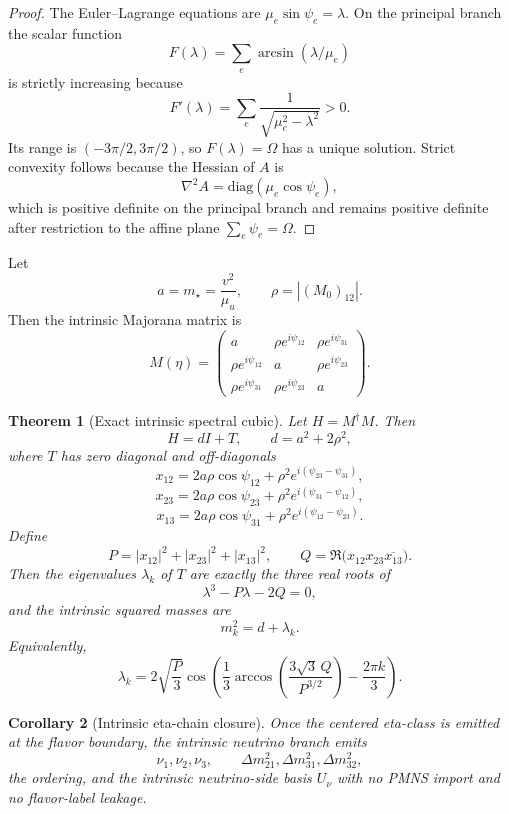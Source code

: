 \documentclass[11pt]{article}
\newtheorem{theorem}{Theorem}[section]
\newtheorem{corollary}[theorem]{Corollary}
\begin{document}
\begin{proof}
The Euler--Lagrange equations are \(\mu_e\sin\psi_e=\lambda\). On the principal branch the scalar
function
\[
F(\lambda)=\sum_e\arcsin(\lambda/\mu_e)
\]
is strictly increasing because
\[
F'(\lambda)=\sum_e\frac{1}{\sqrt{\mu_e^2-\lambda^2}}>0.
\]
Its range is \((-3\pi/2,3\pi/2)\), so \(F(\lambda)=\Omega\) has a unique solution. Strict
convexity follows because the Hessian of \(A\) is
\[
\nabla^2A=\mathrm{diag}(\mu_e\cos\psi_e),
\]
which is positive definite on the principal branch and remains positive definite after
restriction to the affine plane \(\sum_e\psi_e=\Omega\).
\end{proof}

Let
\[
a=m_\star=\frac{v^2}{\mu_u},
\qquad
\rho = |(M_0)_{12}|.
\]
Then the intrinsic Majorana matrix is
\[
M(\eta)=
\begin{pmatrix}
a & \rho e^{i\psi_{12}} & \rho e^{i\psi_{31}}\\
\rho e^{i\psi_{12}} & a & \rho e^{i\psi_{23}}\\
\rho e^{i\psi_{31}} & \rho e^{i\psi_{23}} & a
\end{pmatrix}.
\]

\begin{theorem}[Exact intrinsic spectral cubic]
Let \(H=M^\dagger M\). Then
\[
H=dI+T,
\qquad
d=a^2+2\rho^2,
\]
where \(T\) has zero diagonal and off-diagonals
\[
x_{12}=2a\rho\cos\psi_{12}+\rho^2e^{i(\psi_{23}-\psi_{31})},
\]
\[
x_{23}=2a\rho\cos\psi_{23}+\rho^2e^{i(\psi_{31}-\psi_{12})},
\]
\[
x_{13}=2a\rho\cos\psi_{31}+\rho^2e^{i(\psi_{12}-\psi_{23})}.
\]
Define
\[
P=|x_{12}|^2+|x_{23}|^2+|x_{13}|^2,
\qquad
Q=\Re\!\bigl(x_{12}x_{23}\overline{x_{13}}\bigr).
\]
Then the eigenvalues \(\lambda_k\) of \(T\) are exactly the three real roots of
\[
\lambda^3-P\lambda-2Q=0,
\]
and the intrinsic squared masses are
\[
m_k^2=d+\lambda_k.
\]
Equivalently,
\[
\lambda_k=
2\sqrt{\frac{P}{3}}
\cos\!\left(
\frac13\arccos\!\left(\frac{3\sqrt3\,Q}{P^{3/2}}\right)-\frac{2\pi k}{3}
\right).
\]
\end{theorem}

\begin{corollary}[Intrinsic eta-chain closure]
Once the centered eta-class is emitted at the flavor boundary, the intrinsic neutrino branch
emits
\[
\nu_1,\nu_2,\nu_3,\qquad
\Delta m_{21}^2,\Delta m_{31}^2,\Delta m_{32}^2,
\]
the ordering, and the intrinsic neutrino-side basis \(U_\nu\) with no PMNS import and no
flavor-label leakage.
\end{corollary}
\end{document}
